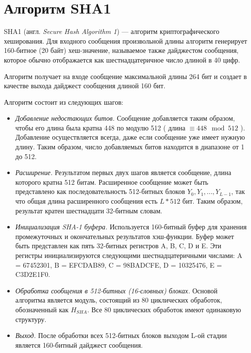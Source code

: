 \section{Алгоритм SHA1}

SHA1 (англ. \textit{Secure Hash Algorithm 1}) --- алгоритм криптографического хеширования. Для входного сообщения произвольной длины алгоритм генерирует 160-битное (20 байт) хеш-значение, называемое также дайджестом сообщения, которое обычно отображается как шестнадцатеричное число длиной в 40 цифр.

Алгоритм получает на входе сообщение максимальной длины 264 бит и создает в качестве выхода дайджест сообщения длиной 160 бит.

Алгоритм состоит из следующих шагов:
\begin{itemize}
	\item \textit{Добавление недостающих битов.} Сообщение добавляется таким образом, чтобы его длина была кратна 448 по модулю 512 ( длина $\equiv  448 \mod 512$ ). Добавление осуществляется всегда, даже если сообщение уже имеет нужную длину. Таким образом, число добавляемых битов находится в диапазоне от 1 до 512.
	\item \textit{Расширение.} Результатом первых двух шагов является сообщение, длина которого кратна 512 битам. Расширенное сообщение может быть представлено как последовательность 512-битных блоков $Y_0, Y_1, . . . , Y_{L-1}$, так что общая длина расширенного сообщения есть $L * 512$ бит. Таким образом, результат кратен шестнадцати 32-битным словам.
	\item \textit{Инициализация SHA-1 буфера.} Используется 160-битный буфер для хранения промежуточных и окончательных результатов хэш-функции. Буфер может быть представлен как пять 32-битных регистров A, B, C, D и E. Эти регистры инициализируются следующими шестнадцатеричными числами: A = 67452301, B = EFCDAB89, C = 98BADCFE, D = 10325476, E = C3D2E1F0.
	\item \textit{Обработка сообщения в 512-битных (16-словных) блоках.} Основой алгоритма является модуль, состоящий из 80 циклических обработок, обозначенный как $H_{SHA}$. Все 80 циклических обработок имеют одинаковую структуру.
	\item \textit{Выход.} После обработки всех 512-битных блоков выходом L-ой стадии является 160-битный дайджест сообщения.
\end{itemize}
